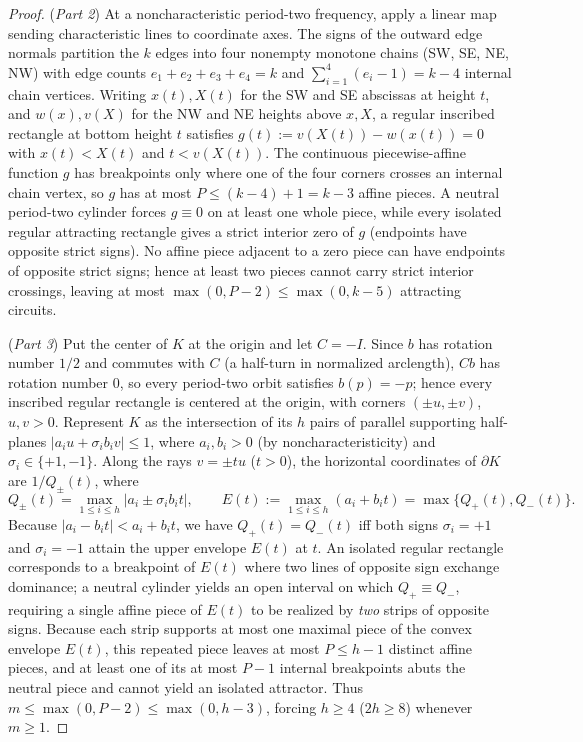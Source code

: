 \documentclass[11pt,reqno]{amsart}
\theoremstyle{definition}
\theoremstyle{remark}
\begin{document}
\begin{proof}
(\emph{Part 2}) At a noncharacteristic period-two frequency, apply a linear map sending characteristic lines to coordinate axes. The signs of the outward edge normals partition the $k$ edges into four nonempty monotone chains (SW, SE, NE, NW) with edge counts $e_1 + e_2 + e_3 + e_4 = k$ and $\sum_{i=1}^4 (e_i - 1) = k - 4$ internal chain vertices. Writing $x(t), X(t)$ for the SW and SE abscissas at height $t$, and $w(x), v(X)$ for the NW and NE heights above $x, X$, a regular inscribed rectangle at bottom height $t$ satisfies $g(t) := v(X(t)) - w(x(t)) = 0$ with $x(t) < X(t)$ and $t < v(X(t))$. The continuous piecewise-affine function $g$ has breakpoints only where one of the four corners crosses an internal chain vertex, so $g$ has at most $P \le (k-4) + 1 = k - 3$ affine pieces. A neutral period-two cylinder forces $g \equiv 0$ on at least one whole piece, while every isolated regular attracting rectangle gives a strict interior zero of $g$ (endpoints have opposite strict signs). No affine piece adjacent to a zero piece can have endpoints of opposite strict signs; hence at least two pieces cannot carry strict interior crossings, leaving at most $\max(0, P - 2) \le \max(0, k - 5)$ attracting circuits.

(\emph{Part 3}) Put the center of $K$ at the origin and let $C = -I$. Since $b$ has rotation number $1/2$ and commutes with $C$ (a half-turn in normalized arclength), $Cb$ has rotation number $0$, so every period-two orbit satisfies $b(p) = -p$; hence every inscribed regular rectangle is centered at the origin, with corners $(\pm u, \pm v)$, $u, v > 0$. Represent $K$ as the intersection of its $h$ pairs of parallel supporting half-planes $|a_i u + \sigma_i b_i v| \le 1$, where $a_i, b_i > 0$ (by noncharacteristicity) and $\sigma_i \in \{+1, -1\}$. Along the rays $v = \pm t u$ ($t > 0$), the horizontal coordinates of $\partial K$ are $1/Q_\pm(t)$, where
\[
  Q_\pm(t) = \max_{1 \le i \le h} |a_i \pm \sigma_i b_i t|, \qquad E(t) := \max_{1 \le i \le h} (a_i + b_i t) = \max\{Q_+(t), Q_-(t)\}.
\]
Because $|a_i - b_i t| < a_i + b_i t$, we have $Q_+(t) = Q_-(t)$ iff both signs $\sigma_i = +1$ and $\sigma_i = -1$ attain the upper envelope $E(t)$ at $t$. An isolated regular rectangle corresponds to a breakpoint of $E(t)$ where two lines of opposite sign exchange dominance; a neutral cylinder yields an open interval on which $Q_+ \equiv Q_-$, requiring a single affine piece of $E(t)$ to be realized by \emph{two} strips of opposite signs. Because each strip supports at most one maximal piece of the convex envelope $E(t)$, this repeated piece leaves at most $P \le h - 1$ distinct affine pieces, and at least one of its at most $P - 1$ internal breakpoints abuts the neutral piece and cannot yield an isolated attractor. Thus $m \le \max(0, P - 2) \le \max(0, h - 3)$, forcing $h \ge 4$ ($2h \ge 8$) whenever $m \ge 1$.
\end{proof}
\end{document}
